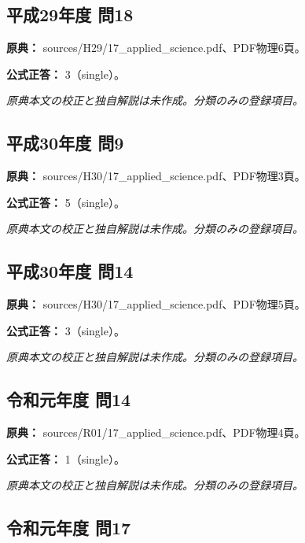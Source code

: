 \subsection{平成29年度 問18}
\label{q:h29-reg-applied-18}

\noindent\textbf{原典：} sources/H29/17\_applied\_science.pdf、PDF物理6頁。

\textbf{公式正答：} 3（single）。

\par\textit{原典本文の校正と独自解説は未作成。分類のみの登録項目。}

\subsection{平成30年度 問9}
\label{q:h30-reg-applied-09}

\noindent\textbf{原典：} sources/H30/17\_applied\_science.pdf、PDF物理3頁。

\textbf{公式正答：} 5（single）。

\par\textit{原典本文の校正と独自解説は未作成。分類のみの登録項目。}

\subsection{平成30年度 問14}
\label{q:h30-reg-applied-14}

\noindent\textbf{原典：} sources/H30/17\_applied\_science.pdf、PDF物理5頁。

\textbf{公式正答：} 3（single）。

\par\textit{原典本文の校正と独自解説は未作成。分類のみの登録項目。}

\subsection{令和元年度 問14}
\label{q:r01-reg-applied-14}

\noindent\textbf{原典：} sources/R01/17\_applied\_science.pdf、PDF物理4頁。

\textbf{公式正答：} 1（single）。

\par\textit{原典本文の校正と独自解説は未作成。分類のみの登録項目。}

\subsection{令和元年度 問17}
\label{q:r01-reg-applied-17}

